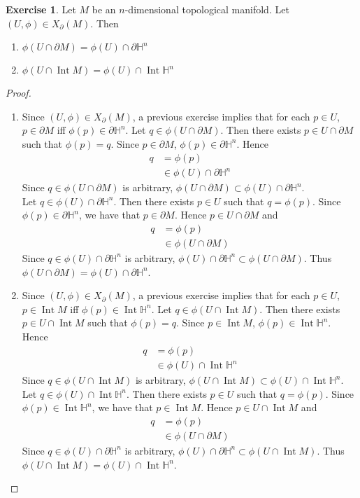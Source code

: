 \documentclass{book}
\theoremstyle{definition}
\newtheorem{ex}[definition]{Exercise}
\renewcommand{\H}{\mathbb{H}}
\DeclareMathOperator{\Int}{Int}
\DeclareMathOperator*{\0}{\mbf{0}}
\DeclareMathOperator*{\1}{\mbf{1}}
\newcommand{\p}{\partial}
\begin{document}
	\begin{ex}
		Let $M$ be an $n$-dimensional topological manifold. Let $(U, \phi) \in X_{\p}(M)$. Then 
		\begin{enumerate}
			\item $\phi(U \cap \p M) = \phi(U) \cap \p \H^n$ 
			\item $\phi(U \cap \Int M) = \phi(U) \cap \Int \H^n$ 
		\end{enumerate}
	\end{ex}

	\begin{proof} \
		\begin{enumerate}
			\item Since $(U, \phi) \in X_{\p}(M)$, a previous exercise implies that for each $p \in U$, $p \in \p M$ iff $\phi(p) \in \p \H^n$. Let $q \in \phi(U \cap \p M)$. Then there exists $p \in U \cap \p M$ such that $\phi(p) = q$. Since $p \in \p M$, $\phi(p) \in \p \H^n$. Hence 
			\begin{align*}
				q 
				& = \phi(p) \\
				& \in \phi(U) \cap \p \H^n
			\end{align*}
			Since $q \in \phi(U \cap \p M)$ is arbitrary, $\phi(U \cap \p M) \subset \phi(U) \cap \p \H^n$. \\
			Let $q \in \phi(U) \cap \p \H^n$. Then there exists $p \in U$ such that $q = \phi(p)$. Since $\phi(p) \in \p \H^n$, we have that $p \in \p M$. Hence $p \in U \cap \p M$ and 
			\begin{align*}
				q 
				& = \phi(p) \\
				& \in \phi(U \cap \p M)
			\end{align*}
			Since $q \in \phi(U) \cap \p \H^n$ is arbitrary, $\phi(U) \cap \p \H^n \subset \phi(U \cap \p M)$. Thus $\phi(U \cap \p M) = \phi(U) \cap \p \H^n$.
			\item Since $(U, \phi) \in X_{\p}(M)$, a previous exercise implies that for each $p \in U$, $p \in \Int M$ iff $\phi(p) \in \Int \H^n$.  Let $q \in \phi(U \cap \Int M)$. Then there exists $p \in U \cap \Int M$ such that $\phi(p) = q$. Since $p \in \Int M$, $\phi(p) \in \Int \H^n$. Hence 
			\begin{align*}
				q 
				& = \phi(p) \\
				& \in \phi(U) \cap \Int \H^n
			\end{align*}
			Since $q \in \phi(U \cap \Int M)$ is arbitrary, $\phi(U \cap \Int M) \subset \phi(U) \cap \Int \H^n$. \\
			Let $q \in \phi(U) \cap \Int \H^n$. Then there exists $p \in U$ such that $q = \phi(p)$. Since $\phi(p) \in \Int \H^n$, we have that $p \in \Int M$. Hence $p \in U \cap \Int M$ and 
			\begin{align*}
				q 
				& = \phi(p) \\
				& \in \phi(U \cap \p M)
			\end{align*}
			Since $q \in \phi(U) \cap \p \H^n$ is arbitrary, $\phi(U) \cap \p \H^n \subset \phi(U \cap \Int M)$. Thus $\phi(U \cap \Int M) = \phi(U) \cap \Int \H^n$.
		\end{enumerate}
	\end{proof}
\end{document}
